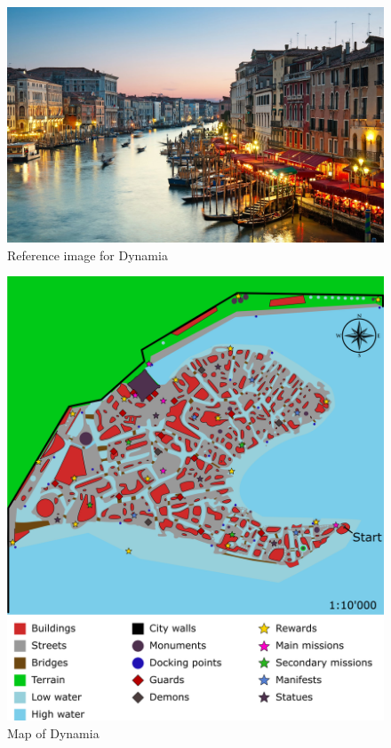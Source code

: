 \begin{figure}[H]
  \centering
  \includegraphics[width=\textwidth]{../../References/Images/Dynamia/venice-restaurants-by-canal}
  \caption{Reference image for Dynamia}
\end{figure}

\begin{figure}[H]
  \centering
  \includegraphics[width=\textwidth]{Images/Maps/dynamia}
  \caption{Map of Dynamia}
\end{figure}

